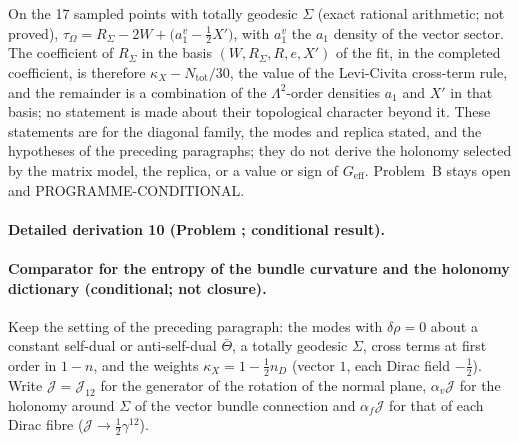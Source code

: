 On the 17 sampled points with totally geodesic \(\Sigma\) (exact rational arithmetic; not proved), \(\tau_\Omega=R_\Sigma-2W+\bigl(a_1^{v}-\tfrac12X'\bigr)\), with \(a_1^{v}\) the \(a_1\) density of the vector sector. The coefficient of \(R_\Sigma\) in the basis \((W,R_\Sigma,R,e,X')\) of the fit, in the completed coefficient, is therefore \(\kappa_X-N_{\mathrm{tot}}/30\), the value of the Levi-Civita cross-term rule, and the remainder is a combination of the \(\Lambda^2\)-order densities \(a_1\) and \(X'\) in that basis; no statement is made about their topological character beyond it. These statements are for the diagonal family, the modes and replica stated, and the hypotheses of the preceding paragraphs; they do not derive the holonomy selected by the matrix model, the replica, or a value or sign of \(G_{\mathrm{eff}}\). Problem~B stays open and PROGRAMME-CONDITIONAL.



\paragraph{Detailed derivation 10 (Problem ; conditional result).} \label{ref:detail-9} %



\paragraph{Comparator for the entropy of the bundle curvature and the holonomy dictionary (conditional; not closure).}

Keep the setting of the preceding paragraph: the modes with \(\delta\rho=0\) about a constant self-dual or anti-self-dual \(\bar\Theta\), a totally geodesic \(\Sigma\), cross terms at first order in \(1-n\), and the weights \(\kappa_X=1-\tfrac12n_D\) (vector \(1\), each Dirac field \(-\tfrac12\)). Write \(\mathcal J=\mathcal J_{12}\) for the generator of the rotation of the normal plane, \(\alpha_v\mathcal J\) for the holonomy around \(\Sigma\) of the vector bundle connection and \(\alpha_f\mathcal J\) for that of each Dirac fibre (\(\mathcal J\to\tfrac12\gamma^{12}\)).



